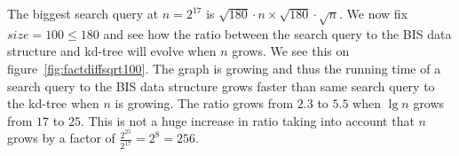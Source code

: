 The biggest search query at $n = 2^{17}$ is $\sqrt{180}\cdot{n} \times \sqrt{180}\cdot\sqrt{n}$. We now fix $size = 100 \leq 180$ and see how the ratio between the search query to the BIS data structure and kd-tree will evolve when $n$ grows. We see this on figure~\ref{fig:factdiffsqrt100}. The graph is growing and thus the running time of a search query to the BIS data structure grows faster than same search query to the kd-tree when $n$ is growing. The ratio grows from $2.3$ to $5.5$ when $\lg n$ grows from $17$ to $25$. This is not a huge increase in ratio taking into account that $n$ grows by a factor of $\frac{2^{25}}{2^{17}} = 2^8 = 256$.

\begin{figure}[h]
\end{figure}
